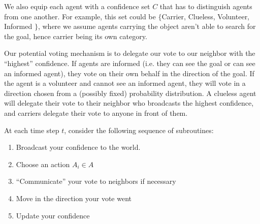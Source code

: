 \documentclass[12pt]{article}
\begin{document}
We also equip each agent with a confidence set $C$ that has to distinguish agents from one another.
For example, this set could be $\{$Carrier, Clueless, Volunteer, Informed $\}$, where we assume agents carrying the object aren't able to search for the goal, hence carrier being its own category.

Our potential voting mechanism is to delegate our vote to our neighbor with the ``highest'' confidence.
If agents are informed (i.e. they can see the goal or can see an informed agent), they vote on their own behalf in the direction of the goal.
If the agent is a volunteer and cannot see an informed agent, they will vote in a direction chosen from a (possibly  fixed) probability distribution.
A clueless agent will delegate their vote to their neighbor who broadcasts the highest confidence, and carriers delegate their vote to anyone in front of them.

At each time step $t$, consider the following sequence of subroutines:
\begin{enumerate}
	\item Broadcast your confidence to the world.
	\item Choose an action $A_i \in A$
	\item ``Communicate'' your vote to neighbors if necessary
	\item Move in the direction your vote went
	\item Update your confidence
\end{enumerate}
\end{document}
